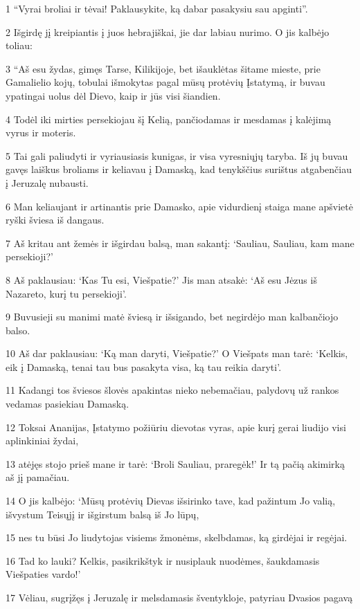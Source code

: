 \par 1 “Vyrai broliai ir tėvai! Paklausykite, ką dabar pasakysiu sau apginti”. 
\par 2 Išgirdę jį kreipiantis į juos hebrajiškai, jie dar labiau nurimo. O jis kalbėjo toliau: 
\par 3 “Aš esu žydas, gimęs Tarse, Kilikijoje, bet išauklėtas šitame mieste, prie Gamalielio kojų, tobulai išmokytas pagal mūsų protėvių Įstatymą, ir buvau ypatingai uolus dėl Dievo, kaip ir jūs visi šiandien. 
\par 4 Todėl iki mirties persekiojau šį Kelią, pančiodamas ir mesdamas į kalėjimą vyrus ir moteris. 
\par 5 Tai gali paliudyti ir vyriausiasis kunigas, ir visa vyresniųjų taryba. Iš jų buvau gavęs laiškus broliams ir keliavau į Damaską, kad tenykščius surištus atgabenčiau į Jeruzalę nubausti. 
\par 6 Man keliaujant ir artinantis prie Damasko, apie vidurdienį staiga mane apšvietė ryški šviesa iš dangaus. 
\par 7 Aš kritau ant žemės ir išgirdau balsą, man sakantį: ‘Sauliau, Sauliau, kam mane persekioji?’ 
\par 8 Aš paklausiau: ‘Kas Tu esi, Viešpatie?’ Jis man atsakė: ‘Aš esu Jėzus iš Nazareto, kurį tu persekioji’. 
\par 9 Buvusieji su manimi matė šviesą ir išsigando, bet negirdėjo man kalbančiojo balso. 
\par 10 Aš dar paklausiau: ‘Ką man daryti, Viešpatie?’ O Viešpats man tarė: ‘Kelkis, eik į Damaską, tenai tau bus pasakyta visa, ką tau reikia daryti’. 
\par 11 Kadangi tos šviesos šlovės apakintas nieko nebemačiau, palydovų už rankos vedamas pasiekiau Damaską. 
\par 12 Toksai Ananijas, Įstatymo požiūriu dievotas vyras, apie kurį gerai liudijo visi aplinkiniai žydai, 
\par 13 atėjęs stojo prieš mane ir tarė: ‘Broli Sauliau, praregėk!’ Ir tą pačią akimirką aš jį pamačiau. 
\par 14 O jis kalbėjo: ‘Mūsų protėvių Dievas išsirinko tave, kad pažintum Jo valią, išvystum Teisųjį ir išgirstum balsą iš Jo lūpų, 
\par 15 nes tu būsi Jo liudytojas visiems žmonėms, skelbdamas, ką girdėjai ir regėjai. 
\par 16 Tad ko lauki? Kelkis, pasikrikštyk ir nusiplauk nuodėmes, šaukdamasis Viešpaties vardo!’ 
\par 17 Vėliau, sugrįžęs į Jeruzalę ir melsdamasis šventykloje, patyriau Dvasios pagavą 
